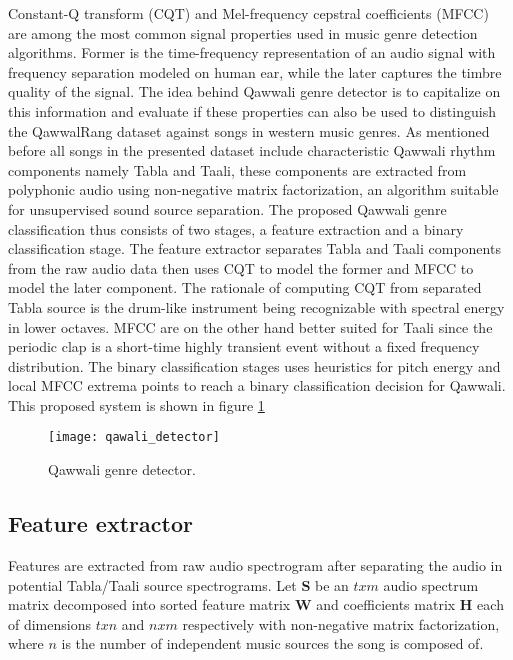 \documentclass{article}
\begin{document}
Constant-Q transform (CQT) and Mel-frequency cepstral coefficients (MFCC) are  among the most common signal properties \citep{panagakis} used in music genre detection algorithms. Former is the time-frequency representation of an audio signal with frequency separation modeled on human ear, while the later captures the timbre quality of the signal. The idea behind Qawwali genre detector is to capitalize on this information and evaluate if these properties can also be used to distinguish the QawwalRang dataset against songs in western music genres.
As mentioned before all songs in the presented dataset include characteristic Qawwali rhythm components namely Tabla and Taali, these components are extracted from polyphonic audio using non-negative matrix factorization, an algorithm \citep{virtanen} suitable for unsupervised sound source separation.
The proposed Qawwali genre classification thus consists of two stages, a feature extraction and a binary classification stage. The feature extractor separates Tabla and Taali components from the raw audio data then uses CQT to model the former and MFCC to model the later component. The rationale of computing CQT from separated Tabla source is the drum-like instrument being recognizable with spectral energy in lower octaves. MFCC are on the other hand better suited for Taali since the periodic clap is a short-time highly transient event without a fixed frequency distribution. The binary classification stages uses heuristics for pitch energy and local MFCC extrema points to reach a binary classification decision for Qawwali. This proposed system is shown in figure \ref{fig:block_dia}
\begin{figure}[htbp]
  \centering
  \texttt{[image: qawali\_detector]}
  \caption{Qawwali genre detector.}
\label{fig:block_dia}
\end{figure}

\subsection{Feature extractor}

Features are extracted from raw audio spectrogram after separating the audio in potential Tabla/Taali source spectrograms. Let $\boldsymbol{S}$ be an $txm$ audio spectrum matrix decomposed into sorted feature matrix $\boldsymbol{W}$ and coefficients matrix $\boldsymbol{H}$ each of dimensions $txn$ and $nxm$ respectively with non-negative matrix factorization, where $n$ is the number of independent music sources the song is composed of.
\end{document}
